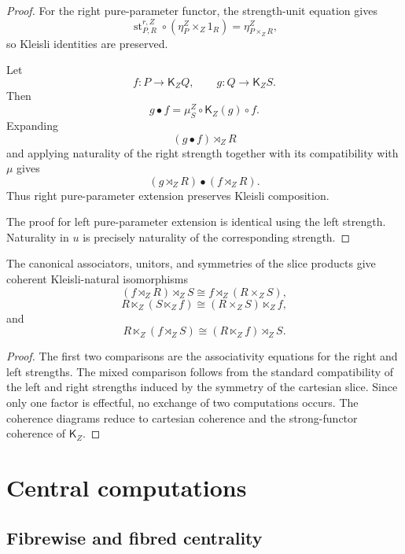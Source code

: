 \begin{proof}
For the right pure-parameter functor, the strength-unit equation gives
\[
    \operatorname{st}^{r,Z}_{P,R}
    \circ
    (\eta^Z_P\times_Z1_R)
    =
    \eta^Z_{P\times_ZR},
\]
so Kleisli identities are preserved.

Let
\[
    f:P\to\mathsf K_ZQ,
    \qquad
    g:Q\to\mathsf K_ZS.
\]
Then
\[
    g\bullet f
    =
    \mu^Z_S
    \circ
    \mathsf K_Z(g)
    \circ
    f.
\]
Expanding
\[
    (g\bullet f)\rtimes_ZR
\]
and applying naturality of the right strength together with its compatibility
with \(\mu\) gives
\[
    (g\rtimes_ZR)
    \bullet
    (f\rtimes_ZR).
\]
Thus right pure-parameter extension preserves Kleisli composition.

The proof for left pure-parameter extension is identical using the left
strength.  Naturality in \(u\) is precisely naturality of the corresponding
strength.
\end{proof}

\begin{proposition}
\label{prop:pure-parameter-coherence}
The canonical associators, unitors, and symmetries of the slice products give
coherent Kleisli-natural isomorphisms
\[
    (f\rtimes_ZR)\rtimes_ZS
    \cong
    f\rtimes_Z(R\times_ZS),
\]
\[
    R\ltimes_Z(S\ltimes_Zf)
    \cong
    (R\times_ZS)\ltimes_Zf,
\]
and
\[
    R\ltimes_Z(f\rtimes_ZS)
    \cong
    (R\ltimes_Zf)\rtimes_ZS.
\]
\end{proposition}

\begin{proof}
The first two comparisons are the associativity equations for the right and
left strengths.  The mixed comparison follows from the standard compatibility
of the left and right strengths induced by the symmetry of the cartesian
slice.  Since only one factor is effectful, no exchange of two computations
occurs.  The coherence diagrams reduce to cartesian coherence and the
strong-functor coherence of \(\mathsf K_Z\).
\end{proof}

\section{Central computations}
\label{sec:central-computations}

\subsection{Fibrewise and fibred centrality}
\label{subsec:fibred-central-kleisli-arrows}

